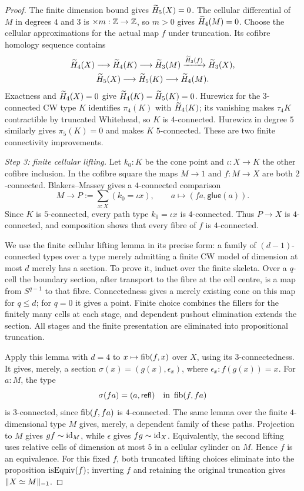 \begin{proof}
The finite dimension bound gives $\widetilde H_5(X)=0$. The cellular differential of $M$ in degrees $4$ and $3$ is $\times m:\mathbb Z\to\mathbb Z$, so $m>0$ gives $\widetilde H_4(M)=0$. Choose the cellular approximations for the actual map $f$ under truncation. Its cofibre homology sequence contains
\[
\begin{gathered}
\widetilde H_4(X)\longrightarrow\widetilde H_4(K)\longrightarrow\widetilde H_3(M)
 \xrightarrow{\widetilde H_3(f)}\widetilde H_3(X),\\
\widetilde H_5(X)\longrightarrow\widetilde H_5(K)\longrightarrow\widetilde H_4(M).
\end{gathered}
\]
Exactness and $\widetilde H_4(X)=0$ give $\widetilde H_4(K)=\widetilde H_5(K)=0$. Hurewicz for the $3$-connected CW type $K$ identifies $\pi_4(K)$ with $\widetilde H_4(K)$; its vanishing makes $\tau_4K$ contractible by truncated Whitehead, so $K$ is $4$-connected. Hurewicz in degree $5$ similarly gives $\pi_5(K)=0$ and makes $K$ $5$-connected. These are two finite connectivity improvements.

\emph{Step 3: finite cellular lifting.}
Let $k_0:K$ be the cone point and $\iota:X\to K$ the other cofibre inclusion. In the cofibre square the maps $M\to1$ and $f:M\to X$ are both $2$-connected. Blakers--Massey \cite{bm} gives a $4$-connected comparison
\[
M\longrightarrow P:=\sum_{x:X}(k_0=\iota x),
\qquad a\longmapsto(fa,\mathsf{glue}(a)).
\]
Since $K$ is $5$-connected, every path type $k_0=\iota x$ is $4$-connected. Thus $P\to X$ is $4$-connected, and composition shows that every fibre of $f$ is $4$-connected.

We use the finite cellular lifting lemma in its precise form: a family of $(d-1)$-connected types over a type merely admitting a finite CW model of dimension at most $d$ merely has a section. To prove it, induct over the finite skeleta. Over a $q$-cell the boundary section, after transport to the fibre at the cell centre, is a map from $S^{q-1}$ to that fibre. Connectedness gives a merely existing cone on this map for $q\leq d$; for $q=0$ it gives a point. Finite choice combines the fillers for the finitely many cells at each stage, and dependent pushout elimination extends the section. All stages and the finite presentation are eliminated into propositional truncation.

Apply this lemma with $d=4$ to $x\mapsto\operatorname{fib}(f,x)$ over $X$, using its $3$-connectedness. It gives, merely, a section $\sigma(x)=(g(x),\epsilon_x)$, where $\epsilon_x:f(g(x))=x$. For $a:M$, the type
\[
\sigma(fa)=(a,\mathsf{refl})\quad\text{in }\operatorname{fib}(f,fa)
\]
is $3$-connected, since $\operatorname{fib}(f,fa)$ is $4$-connected. The same lemma over the finite $4$-dimensional type $M$ gives, merely, a dependent family of these paths. Projection to $M$ gives $g f\sim\operatorname{id}_M$, while $\epsilon$ gives $f g\sim\operatorname{id}_X$. Equivalently, the second lifting uses relative cells of dimension at most $5$ in a cellular cylinder on $M$. Hence $f$ is an equivalence. For this fixed $f$, both truncated lifting choices eliminate into the proposition $\operatorname{isEquiv}(f)$; inverting $f$ and retaining the original truncation gives $\lVert X\simeq M\rVert_{-1}$.
\end{proof}

